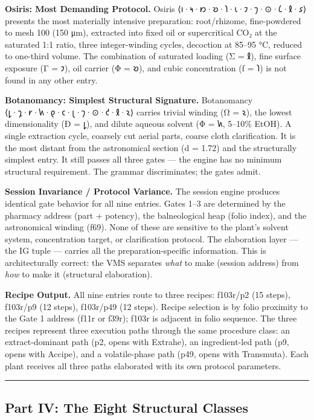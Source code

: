 \documentclass[12pt,a4paper]{article}
\begin{document}
\textbf{Osiris: Most Demanding Protocol.} Osiris
⟨𐑦·𐑰·𐑽·𐑹·𐑐·𐑧·𐑲·𐑠·⊙·𐑖·𐑙·𐑭⟩ presents the most materially intensive
preparation: root/rhizome, fine-powdered to mesh 100 (150 μm), extracted
into fixed oil or supercritical CO₂ at the saturated 1:1 ratio, three
integer-winding cycles, decoction at 85--95 °C, reduced to one-third
volume. The combination of saturated loading (Σ = 𐑙), fine surface
exposure (Γ = 𐑲), oil carrier (Φ = 𐑹), and cubic concentration (ƒ = 𐑐)
is not found in any other entry.

\textbf{Botanomancy: Simplest Structural Signature.} Botanomancy
⟨𐑛·𐑡·𐑾·𐑿·𐑞·𐑤·𐑚·𐑠·⊙·𐑒·𐑙·𐑷⟩ carries trivial winding (Ω = 𐑷), the lowest
dimensionality (Ð = 𐑛), and dilute aqueous solvent (Φ = 𐑿, 5--10\%
EtOH). A single extraction cycle, coarsely cut aerial parts, coarse
cloth clarification. It is the most distant from the astronomical
section (d = 1.72) and the structurally simplest entry. It still passes
all three gates --- the engine has no minimum structural requirement.
The grammar discriminates; the gates admit.

\textbf{Session Invariance / Protocol Variance.} The session engine
produces identical gate behavior for all nine entries. Gates 1--3 are
determined by the pharmacy address (part + potency), the balneological
heap (folio index), and the astronomical winding (f69). None of these
are sensitive to the plant's solvent system, concentration target, or
clarification protocol. The elaboration layer --- the IG tuple ---
carries all the preparation-specific information. This is
architecturally correct: the VMS separates \emph{what} to make (session
address) from \emph{how} to make it (structural elaboration).

\textbf{Recipe Output.} All nine entries route to three recipes:
f103r/p2 (15 steps), f103r/p9 (12 steps), f103r/p49 (12 steps). Recipe
selection is by folio proximity to the Gate 1 address (f11r or f39r);
f103r is adjacent in folio sequence. The three recipes represent three
execution paths through the same procedure class: an extract-dominant
path (p2, opens with Extrahe), an ingredient-led path (p9, opens with
Accipe), and a volatile-phase path (p49, opens with Transmuta). Each
plant receives all three paths elaborated with its own protocol
parameters.

\begin{center}\rule{0.5\linewidth}{0.5pt}\end{center}

\hypertarget{part-iv-the-eight-structural-classes}{%
\subsection{Part IV: The Eight Structural
Classes}\label{part-iv-the-eight-structural-classes}}
\end{document}
